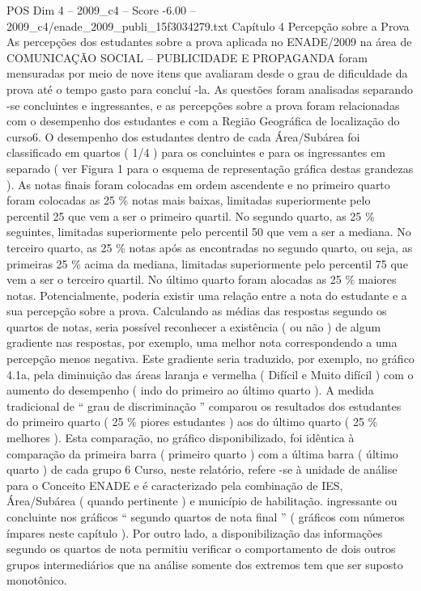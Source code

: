 \begin{textsample}{POS Dim 4 – 2009\_c4 – Score -6.00 – 2009\_c4/enade\_2009\_publi\_15f3034279.txt}  \label{ex:f4_pos_336}
Capítulo 4 Percepção sobre a Prova As percepções dos estudantes sobre a prova aplicada no ENADE/2009 na área de COMUNICAÇÃO SOCIAL – PUBLICIDADE E PROPAGANDA foram mensuradas por meio de nove itens que avaliaram desde o grau de dificuldade da prova até o tempo gasto para concluí -la.
As questões foram analisadas separando -se concluintes e ingressantes, e as percepções sobre a prova foram relacionadas com o desempenho dos estudantes e com a Região Geográfica de localização do curso6.
O desempenho dos estudantes dentro de cada Área/Subárea foi classificado em quartos ( 1/4 ) para os concluintes e para os ingressantes em separado ( ver Figura 1 para o esquema de representação gráfica destas grandezas ).
As notas finais foram colocadas em ordem ascendente e no primeiro quarto foram colocadas as 25 \% notas mais baixas, limitadas superiormente pelo percentil 25 que vem a ser o primeiro quartil.
No segundo quarto, as 25 \% seguintes, limitadas superiormente pelo percentil 50 que vem a ser a mediana.
No terceiro quarto, as 25 \% notas após as encontradas no segundo quarto, ou seja, as primeiras 25 \% acima da mediana, limitadas superiormente pelo percentil 75 que vem a ser o terceiro quartil.
No último quarto foram alocadas as 25 \% maiores notas.
Potencialmente, poderia existir uma relação entre a nota do estudante e a sua percepção sobre a prova.
Calculando as médias das respostas segundo os quartos de notas, seria possível reconhecer a existência ( ou não ) de algum gradiente nas respostas, por exemplo, uma melhor nota correspondendo a uma percepção menos negativa.
Este gradiente seria traduzido, por exemplo, no gráfico 4.1a, pela diminuição das áreas laranja e vermelha ( Difícil e Muito difícil ) com o aumento do desempenho ( indo do primeiro ao último quarto ).
A medida tradicional de “ grau de discriminação ” comparou os resultados dos estudantes do primeiro quarto ( 25 \% piores estudantes ) aos do último quarto ( 25 \% melhores ).
Esta comparação, no gráfico disponibilizado, foi idêntica à comparação da primeira barra ( primeiro quarto ) com a última barra ( último quarto ) de cada grupo 6 Curso, neste relatório, refere -se à unidade de análise para o Conceito ENADE e é caracterizado pela combinação de IES, Área/Subárea ( quando pertinente ) e município de habilitação. ingressante ou concluinte nos gráficos “ segundo quartos de nota final ” ( gráficos com números ímpares neste capítulo ).
Por outro lado, a disponibilização das informações segundo os quartos de nota permitiu verificar o comportamento de dois outros grupos intermediários que na análise somente dos extremos tem que ser suposto monotônico.

\end{textsample}
